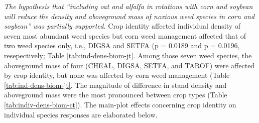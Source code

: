 \documentclass[
]{article}
\begin{document}
\emph{The hypothesis that ``including oat and alfalfa in rotations with corn and soybean will reduce the density and aboveground mass of noxious weed species in corn and soybean'' was partially supported.} Crop identity affected individual density of seven most abundant weed species but corn weed management affected that of two weed species only, i.e., DIGSA and SETFA (p = 0.0189 and p = 0.0196, resepectively; Table \ref{tab:ind-dens-biom-jt}. Among those seven weed species, the aboveground mass of four (CHEAL, DIGSA, SETFA, and TAROF) were affected by crop identity, but none was affected by corn weed management (Table \ref{tab:ind-dens-biom-jt}. The magnitude of difference in stand density and aboveground mass were the most pronounced between crop types (Table \ref{tab:indiv-dens-biom-ct}). The main-plot effects concerning crop identity on individual species responses are elaborated below.
\end{document}
